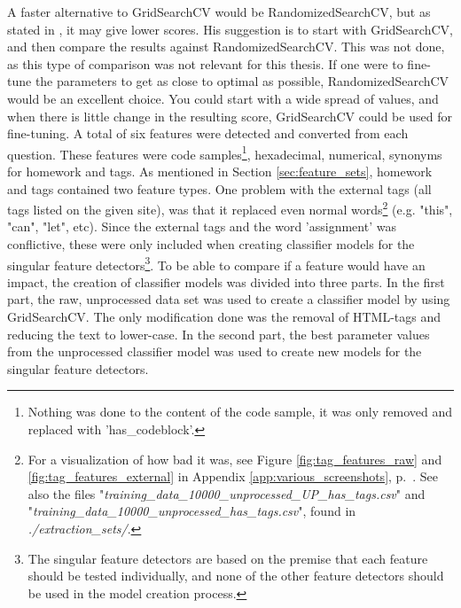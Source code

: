 A faster alternative to GridSearchCV would be RandomizedSearchCV, but as stated in \cite{Markham2015a}, it may give lower scores. 
His suggestion is to start with GridSearchCV, and then compare the results against RandomizedSearchCV.
This was not done, as this type of comparison was not relevant for this thesis.
If one were to fine-tune the parameters to get as close to optimal as possible, RandomizedSearchCV would be an excellent choice. 
You could start with a wide spread of values, and when there is little change in the resulting score, GridSearchCV could be used for fine-tuning.
\vspace{0.5em}\newline
A total of six features were detected and converted from each question. 
These features were code samples\footnote{
	Nothing was done to the content of the code sample, it was only removed and replaced with 'has\_codeblock'.
}, 
hexadecimal, numerical, synonyms for homework and tags. 
As mentioned in Section \ref{sec:feature_sets}, homework and tags contained two feature types. 
One problem with the external tags (all tags listed on the given site), was that it replaced even normal words\footnote{
	For a visualization of how bad it was, see Figure \ref{fig:tag_features_raw} and \ref{fig:tag_features_external} in Appendix \ref{app:various_screenshots}, p.~\pageref{app:various_screenshots}.
	See also the files "\emph{training\_data\_10000\_unprocessed\_UP\_has\_tags.csv}" and "\emph{training\_data\_10000\_unprocessed\_has\_tags.csv}", found in \emph{./extraction\_sets/}.
} (e.g. "this", "can", "let", etc).
Since the external tags and the word 'assignment' was conflictive, these were only included when creating classifier models for the singular feature detectors\footnote{
	The singular feature detectors are based on the premise that each feature should be tested individually, and none of the other feature detectors should be used in the model creation process.
}.
\vspace{0.5em}\newline
To be able to compare if a feature would have an impact, the creation of classifier models was divided into three parts. 
In the first part, the raw, unprocessed data set was used to create a classifier model by using GridSearchCV. 
The only modification done was the removal of HTML-tags and reducing the text to lower-case. 
In the second part, the best parameter values from the unprocessed classifier model was used to create new models for the singular feature detectors.
